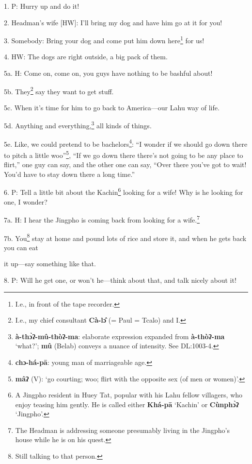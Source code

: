 \setcounter{footnote}{0}

1. P: Hurry up and do it!

2. Headman's wife [HW]: I'll bring my dog and have him go at it for you!

3. Somebody: Bring your dog and come put him down here\footnote{I.e., in front of the tape recorder.} for us!

4. HW: The dogs are right outside, a big pack of them.

5a. H: Come on, come on, you guys have nothing to be bashful about!

5b. They\footnote{I.e., my chief consultant \textbf{Cà-lɔ̂} (= Paul = Tcalo) and I.} say they want to get stuff.

5c. When it's time for him to go back to America---our Lahu way of life.

5d. Anything and everything,\footnote{\textbf{à-thɔ̀ʔ-mû-thòʔ-ma}: elaborate expression expanded from \textbf{à-thòʔ-ma} `what?'; \textbf{mû} (Belab) conveys a nuance of intensity. See DL:1003-4.} all kinds of things.

5e. Like, we could pretend to be bachelors\footnote{\textbf{chɔ-há-pā}: young man of marriageable age.}: ``I wonder if we should go down
there to pitch a little woo''\footnote{\textbf{mâʔ} (V): `go courting; woo; flirt with the opposite sex (of men or women)'.}, ``If we go down there there's not going
to be any place to flirt,'' one guy can say, and the other one can say, ``Over
there you've got to wait! You'd have to stay down there a long time.''

6. P: Tell a little bit about the Kachin\footnote{A Jingpho resident in Huey Tat, popular with his Lahu fellow villagers, who enjoy teasing him gently. He is called either \textbf{Khá-pā} `Kachin' or \textbf{Cùnphɔ̀ʔ }`Jingpho'.} looking for a wife! Why is he looking
for one, I wonder?


7a. H: I hear the Jingpho is coming back from looking for a wife.\footnote{The Headman is addressing someone presumably living in the Jingpho's house while he is on his quest.}

7b. You\footnote{Still talking to that person.} stay at home and pound lots of rice and store it, and when he gets
back you can eat

it up---say something like that.

8. P: Will he get one, or won't he---think about that, and talk nicely about it!

